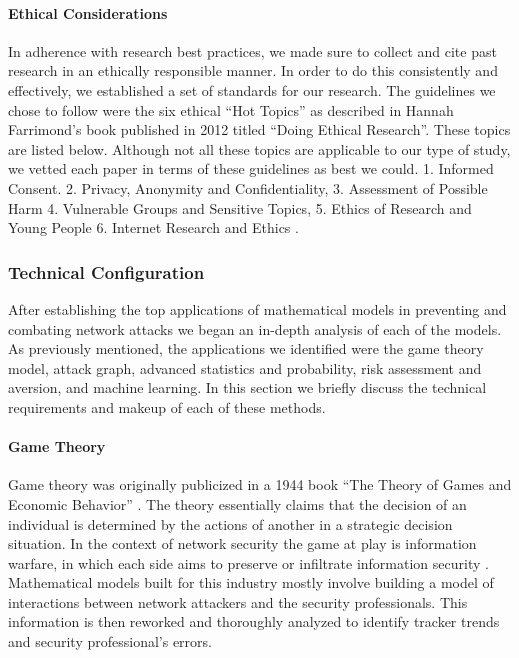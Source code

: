 \documentclass{article}
\begin{document}
\paragraph{Ethical Considerations}
In adherence with research best practices, we made sure to collect and cite past research in an ethically responsible manner. In order to do this consistently and effectively, we established a set of standards for our research. The guidelines we chose to follow were the six ethical “Hot Topics” as described in Hannah Farrimond’s book published in 2012 titled “Doing Ethical Research”. These topics are listed below. Although not all these topics are applicable to our type of study, we vetted each paper in terms of these guidelines as best we could. 
1. Informed Consent. 
2. Privacy, Anonymity and Confidentiality,
3. Assessment of Possible Harm
4. Vulnerable Groups and Sensitive Topics,
5. Ethics of Research and Young People
6. Internet Research and Ethics 
\cite{farrimond2012doing}. 

\subsubsection{Technical Configuration}
After establishing the top applications of mathematical models in preventing and combating network attacks we began an in-depth analysis of each of the models. As previously mentioned, the applications we identified were the game theory model, attack graph, advanced statistics and probability, risk assessment and aversion, and machine learning. In this section we briefly discuss the technical requirements and makeup of each of these methods. 

\paragraph{Game Theory}
Game theory was originally publicized in a 1944 book “The Theory of Games and Economic Behavior” \cite{simon1945theory}. The theory essentially claims that the decision of an individual is determined by the actions of another in a strategic decision situation. In the context of network security the game at play is information warfare, in which each side aims to preserve or infiltrate information security \cite{ roy2010survey}. Mathematical models built for this industry mostly involve building a model of interactions between network attackers and the security professionals. This information is then reworked and thoroughly analyzed to identify tracker trends and security professional’s errors.
\end{document}
